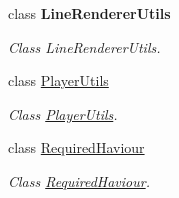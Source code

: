 \begin{DoxyCompactItemize}
class {\bfseries Line\+Renderer\+Utils}
\begin{DoxyCompactList}\small\item\em Class Line\+Renderer\+Utils. \end{DoxyCompactList}\item 
class \hyperlink{class_lerp2_a_p_i_1_1_hepers_1_1_unity___extensions_1_1_utils_1_1_player_utils}{Player\+Utils}
\begin{DoxyCompactList}\small\item\em Class \hyperlink{class_lerp2_a_p_i_1_1_hepers_1_1_unity___extensions_1_1_utils_1_1_player_utils}{Player\+Utils}. \end{DoxyCompactList}\item 
class \hyperlink{class_lerp2_a_p_i_1_1_hepers_1_1_unity___extensions_1_1_utils_1_1_required_haviour}{Required\+Haviour}
\begin{DoxyCompactList}\small\item\em Class \hyperlink{class_lerp2_a_p_i_1_1_hepers_1_1_unity___extensions_1_1_utils_1_1_required_haviour}{Required\+Haviour}. \end{DoxyCompactList}\end{DoxyCompactItemize}

